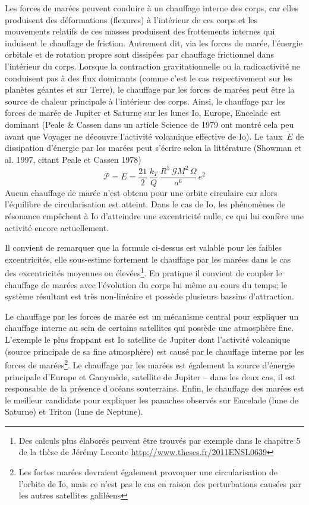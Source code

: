 
\sk
Les forces de marées peuvent conduire à un chauffage interne des corps,
car elles produisent des déformations (flexures) à l'intérieur de ces corps
et les mouvements relatifs de ces masses produisent des frottements internes
qui induisent le chauffage de friction.
Autrement dit, via les forces de marée, l'énergie orbitale et de rotation propre sont dissipées par chauffage frictionnel dans l'intérieur du corps.
Lorsque la contraction gravitationnelle ou la radioactivité ne conduisent
pas à des flux dominants (comme c'est le cas respectivement sur les planètes géantes et sur Terre),
le chauffage par les forces de marées
peut être la source de chaleur principale à l'intérieur des corps.
Ainsi, le chauffage par les forces de marée de Jupiter et Saturne sur 
les lunes Io, Europe, Encelade est dominant
(Peale \& Cassen dans un article Science de 1979 ont
montré cela peu avant que Voyager ne découvre l'activité
volcanique effective de Io).
Le taux~$\dot{E}$ de dissipation d'énergie par les marées peut s'écrire
selon la littérature (Showman et al. 1997, citant Peale et Cassen 1978)
\[ \mathcal{P} = \dot{E} = \frac{21}{2} \, \frac{k_T}{Q} \, \frac{R^5\,\mathcal{G}M^2\,\Omega}{a^6} \, e^2 \]
\noindent Aucun chauffage de marée n'est obtenu pour une orbite circulaire
car alors l'équilibre de circularisation est atteint.
Dans le cas de Io, les phénomènes de résonance empêchent
à Io d'atteindre une excentricité nulle, ce qui lui
confère une activité encore actuellement.

\sk
Il convient de remarquer que la formule ci-dessus est valable
pour les faibles excentricités, elle sous-estime fortement
le chauffage par les marées dans le cas des excentricités moyennes 
ou élevées\footnote{Des calculs plus élaborés peuvent être trouvés par exemple
dans le chapitre 5 de la thèse de Jérémy Leconte \url{http://www.theses.fr/2011ENSL0639}}.
En pratique il convient de coupler le chauffage de marées
avec l'évolution du corps lui même au cours du temps;
le système résultant est très non-linéaire
et possède plusieurs bassins d'attraction.

\sk
Le chauffage par les forces de marée est un mécanisme central pour
expliquer un chauffage interne au sein de certains satellites
qui possède une atmosphère fine. L'exemple le plus frappant
est Io satellite de Jupiter dont l'activité volcanique
(source principale de sa fine atmosphère)
est causé par le chauffage interne par les forces de 
marées\footnote{Les fortes marées devraient également provoquer
une circularisation de l'orbite de Io, mais ce n'est pas le cas
en raison des perturbations causées par les autres satellites galiléens}.
Le chauffage par les marées est également la source d'énergie
principale d'Europe et Ganymède, satellite de Jupiter -- dans les
deux cas, il est responsable de la présence d'océans souterrains.
Enfin, le chauffage des marées est le meilleur candidate pour
expliquer les panaches observés sur Encelade (lune de Saturne)
et Triton (lune de Neptune).









